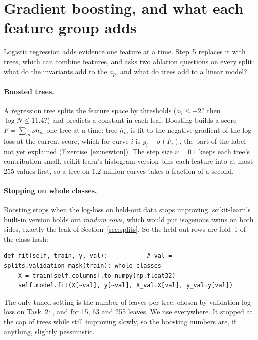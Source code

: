 \documentclass[11pt]{article}
\theoremstyle{definition}
\theoremstyle{plain}
\theoremstyle{remark}
\renewcommand{\_}{\oldunderscore\allowbreak}
\newcommand{\file}[1]{\textcolor{blue!50!black}{\texttt{#1}}}
\newcommand{\codefrom}[1]{\par\smallskip\noindent{\footnotesize\textbf{From} \file{#1}}}
\begin{document}
\section{Gradient boosting, and what each feature group adds}
\label{sec:boosting}

Logistic regression adds evidence one feature at a time. Step~5 replaces it with trees, which
can combine features, and asks two ablation questions on every split: what do the invariants
add to the $a_p$, and what do trees add to a linear model?

\paragraph{Boosted trees.}
A regression tree splits the feature space by thresholds ($a_7\le-2$? then $\log N\le11.4$?) and
predicts a constant in each leaf. Boosting builds a score $F=\sum_m\nu h_m$ one tree at a time:
tree $h_m$ is fit to the negative gradient of the log-loss at the current score, which for
curve $i$ is $y_i-\sigma(F_i)$, the part of the label not yet explained
(Exercise~\ref{ex:newton}). The step size $\nu=0.1$ keeps each tree's contribution small.
scikit-learn's histogram version bins each feature into at most 255 values first, so a tree
on $1.2$ million curves takes a fraction of a second.

\paragraph{Stopping on whole classes.}
Boosting stops when the log-loss on held-out data stops improving. scikit-learn's built-in
version holds out \emph{random rows}, which would put isogenous twins on both sides, exactly
the leak of Section~\ref{sec:splits}. So the held-out rows are fold~1 of the class hash:

\codefrom{src/eclab/models.py}
\begin{lstlisting}
def fit(self, train, y, val):           # val = splits.validation_mask(train): whole classes
    X = train[self.columns].to_numpy(np.float32)
    self.model.fit(X[~val], y[~val], X_val=X[val], y_val=y[val])
\end{lstlisting}

\noindent The only tuned setting is the number of leaves per tree, chosen by validation
log-loss on Task~2: \TuneLossSmall, \TuneLossMid{} and \TuneLossBig{} for 15, 63 and 255 leaves.
We use \Leaves{} everywhere. It stopped at the cap of \LeavesTrees{} trees while still improving
slowly, so the boosting numbers are, if anything, slightly pessimistic.
\end{document}
